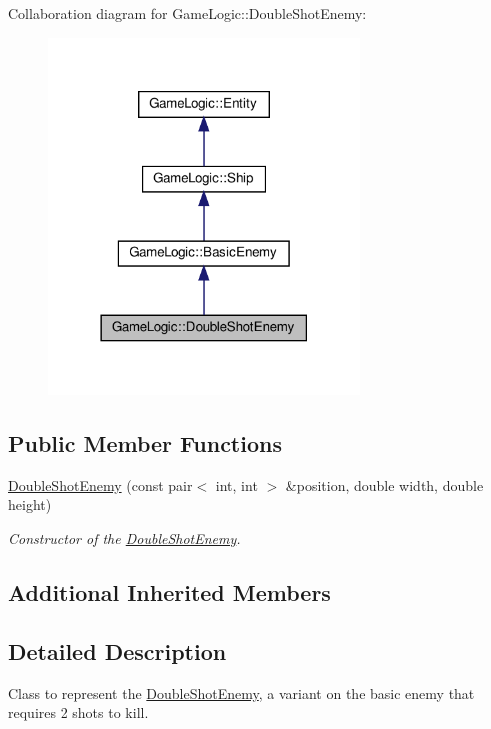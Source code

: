 Collaboration diagram for Game\+Logic\+:\+:Double\+Shot\+Enemy\+:
\nopagebreak
\begin{figure}[H]
\begin{center}
\leavevmode
\includegraphics[width=234pt]{classGameLogic_1_1DoubleShotEnemy__coll__graph}
\end{center}
\end{figure}
\subsection*{Public Member Functions}
\begin{DoxyCompactItemize}
\item 
\hyperlink{classGameLogic_1_1DoubleShotEnemy_af5fc1cc7366c88a37696e3f8640ee88f}{Double\+Shot\+Enemy} (const pair$<$ int, int $>$ \&position, double width, double height)
\begin{DoxyCompactList}\small\item\em Constructor of the \hyperlink{classGameLogic_1_1DoubleShotEnemy}{Double\+Shot\+Enemy}. \end{DoxyCompactList}\end{DoxyCompactItemize}
\subsection*{Additional Inherited Members}


\subsection{Detailed Description}
Class to represent the \hyperlink{classGameLogic_1_1DoubleShotEnemy}{Double\+Shot\+Enemy}, a variant on the basic enemy that requires 2 shots to kill. 

